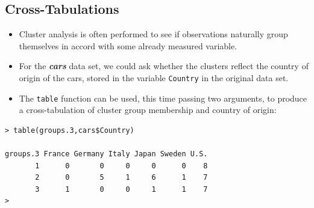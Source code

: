 \documentclass[12pt]{article}
\begin{document}
\newpage
\subsection*{Cross-Tabulations}
\begin{itemize}
\item Cluster analysis is often performed to see if observations naturally group themselves in accord with some already measured variable. 
\item For the \textbf{\textit{cars}} data set, we could ask whether the clusters reflect the country of origin of the cars, stored in the variable \texttt{Country} in the original data set. 
\item The \texttt{table} function can be used, this time passing two arguments, to produce a cross-tabulation of cluster group membership and country of origin:
\end{itemize}
\begin{framed}
\begin{verbatim}
> table(groups.3,cars$Country)

groups.3 France Germany Italy Japan Sweden U.S.
       1      0       0     0     0      0    8
       2      0       5     1     6      1    7
       3      1       0     0     1      1    7
>                                                 
\end{verbatim}
\end{framed}
\end{document}
